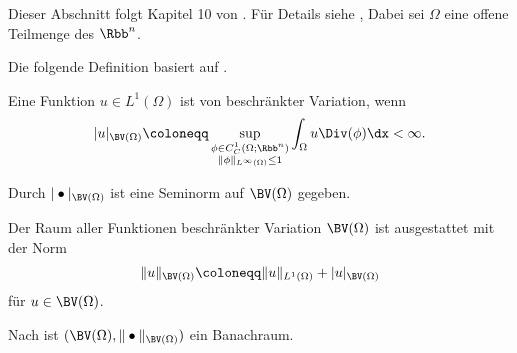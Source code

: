 Dieser Abschnitt folgt Kapitel 10 von \cite{ABM14}. Für Details siehe
\cite{EG92}, 
Dabei sei $\Omega$ eine offene Teilmenge des $\Rbb^n$.


Die folgende Definition basiert auf \cite[S. 393 f.]{ABM14}.

\begin{definition}
  Eine Funktion $u\in L^1(\Omega)$ ist von beschränkter Variation, wenn   
  \begin{align}
    \label{eq:boundedVariation}
    |u|_{\BV(\Omega)}
    \coloneqq
    \sup_{\substack{\phi\in C^1_C(\Omega;\Rbb^n)\\
    \Vert\phi\Vert_{L^\infty(\Omega)}\leq 1}}\int_\Omega u\Div (\phi)\dx
    <
    \infty.
  \end{align}

  Durch $|\bullet|_{\BV(\Omega)}$ ist eine Seminorm auf $\BV(\Omega)$
  gegeben.

  Der Raum aller Funktionen beschränkter Variation $\BV(\Omega)$
  ist ausgestattet mit der Norm 
  \begin{align*}
    \Vert u \Vert_{\BV(\Omega)} \coloneqq \Vert u\Vert_{L^1(\Omega)} +
    |u|_{\BV(\Omega)}
  \end{align*}
  für $u\in\BV(\Omega)$.

  Nach \cite[S. 395, Theorem 10.1.1.]{ABM14} ist $(\BV(\Omega),
  \Vert\bullet\Vert_{\BV(\Omega)})$ ein Banachraum.
\end{definition}

